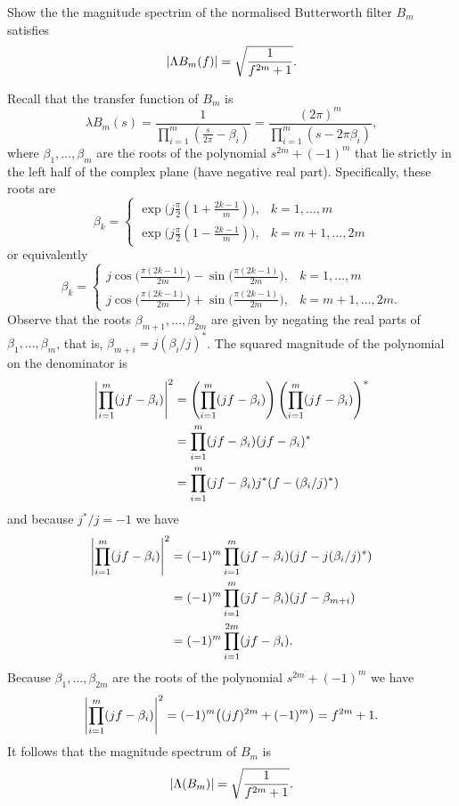 \begin{excersizelist}
\item \label{exer:magspecbutterworth} Show the the magnitude spectrim of the normalised Butterworth filter $B_m$ satisfies
\[
\left\vert \Lambda B_m(f) \right\vert = \sqrt{\frac{1}{f^{2m} + 1}}.
\]
\begin{solution}
Recall that the transfer function of $B_m$ is
\[
\lambda B_m(s) = \frac{1}{\prod_{i=1}^m(\tfrac{s}{2\pi} - \beta_i)} = \frac{(2\pi)^m}{\prod_{i=1}^m(s - 2\pi\beta_i)},
\] 
where $\beta_1,\dots,\beta_m$ are the roots of the polynomial $s^{2m} + (-1)^m$ that lie strictly in the left half of the complex plane (have negative real part).  Specifically, these roots are
\[
\beta_{k} = \begin{cases}
\exp\big(j\tfrac{\pi}{2}( 1 + \tfrac{2k-1}{m} )\big) , & k = 1, \dots, m \\
\exp\big(j\tfrac{\pi}{2}( 1 - \tfrac{2k-1}{m} )\big) , & k = m+1, \dots, 2m
\end{cases}
\]
or equivalently
\[
\beta_k= \begin{cases}
j \cos\big(\tfrac{\pi(2k-1)}{2m}\big) -\sin\big(\tfrac{\pi(2k-1)}{2m}\big), & k = 1, \dots, m \\
j \cos\big(\tfrac{\pi(2k-1)}{2m}\big) + \sin\big(\tfrac{\pi(2k-1)}{2m}\big) , & k = m+1, \dots, 2m.
\end{cases}
\]
Observe that the roots $\beta_{m+1},\dots,\beta_{2m}$ are given by negating the real parts of $\beta_1,\dots,\beta_m$, that is, $\beta_{m+i} = j (\beta_{i}/j)^*$.
The squared magnitude of the polynomial on the denominator is
\begin{align*}
\left\vert \prod_{i=1}^m( j  f - \beta_i) \right\vert^2 &= \left(\prod_{i=1}^m( j  f - \beta_i)\right)\left(\prod_{i=1}^m( j  f - \beta_i)\right)^* \\
&= \prod_{i=1}^m( j  f - \beta_i)(  j f - \beta_i)^* \\
&= \prod_{i=1}^m ( j f - \beta_i) j^* (  f - (\beta_i/j)^*)
\end{align*}
and because $j^*/j = -1$ we have
\begin{align*}
\left\vert \prod_{i=1}^m( j  f - \beta_i) \right\vert^2 &= (-1)^m\prod_{i=1}^m ( j f - \beta_i) (  j f - j (\beta_i/j)^*) \\
&= (-1)^m\prod_{i=1}^m ( j f - \beta_i) (  j f - \beta_{m+i}) \\
&= (-1)^m\prod_{i=1}^{2m} ( j f - \beta_i).
\end{align*}
Because $\beta_1,\dots,\beta_{2m}$ are the roots of the polynomial $s^{2m}+(-1)^m$ we have
\[
\left\vert \prod_{i=1}^m( j  f - \beta_i) \right\vert^2 = (-1)^m \big( ( j f)^{2m} + (-1)^m \big) = f^{2m} + 1.
\]
It follows that the magnitude spectrum of $B_m$ is
\[
\left\vert \Lambda(B_m) \right\vert = \sqrt{\frac{1}{f^{2m} + 1}}.
\]
\end{solution}



\end{excersizelist}
